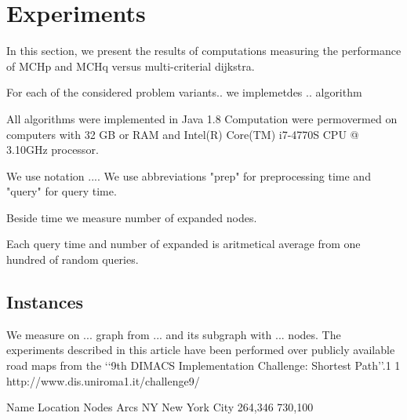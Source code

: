 

\section{Experiments}
In this section, we present the results of computations measuring the performance
of MCHp and MCHq versus multi-criterial dijkstra.

For each of the considered problem variants..
we implemetdes .. algorithm


All algorithms were implemented in Java 1.8 
Computation were permovermed on computers with 32 GB or RAM
and  Intel(R) Core(TM) i7-4770S CPU @ 3.10GHz processor.

We use notation .... We use abbreviations "prep" for preprocessing time
and "query" for query time.

Beside time we measure number of expanded nodes.

Each query time and number of expanded is aritmetical average
from one hundred of random queries.
\subsection{Instances}

We measure on ... graph from ... and its subgraph with ... nodes.
The experiments described in this article have been performed
over publicly available road maps from the ‘‘9th DIMACS Implementation
Challenge: Shortest Path’’.1
1 http://www.dis.uniroma1.it/challenge9/

Name	Location	Nodes	Arcs
NY	New York City	264,346	730,100

